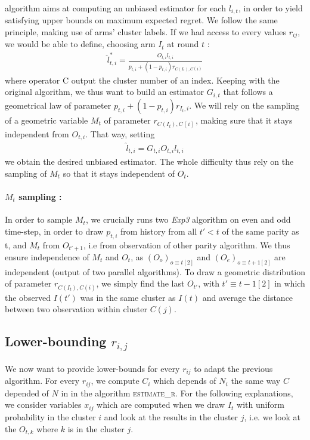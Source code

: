 \documentclass[11pt,a4paper]{article}
\begin{document}
\paragraph{}\cite{valko} algorithm aims at computing an unbiased estimator for each $l_{i,t}$, in order to yield satisfying upper bounds on maximum expected regret. We follow the same principle, making use of arms' cluster labels. If we had access to every values $r_{ij}$, we would be able to define, choosing arm $I_t$ at round $t$ :
\begin{align*}
\hat{l}_{t,i}^{*} = \frac{O_{t,i}l_{t,i}}{p_{t,i}+(1-p_{t,i})r_{C(I_t),C(i)}}
\end{align*}
where operator C output the cluster number of an index.
Keeping with the original algorithm, we thus want to build an estimator $G_{i,t}$ that follows a geometrical law of parameter $p_{t,i}+(1-p_{t,i})r_{I_t,i}$. We will rely on the sampling of a geometric variable $M_t$ of parameter $r_{C(I_t),C(i)}$, making sure that it stays independent from $O_{t,i}$. That way, setting
\begin{align*}
\hat{l}_{t,i}=G_{t,i}O_{t,i}l_{t,i}
\end{align*}
we obtain the desired unbiased estimator. The whole difficulty thus rely on the sampling of $M_t$ so that it stays independent of $O_t$.

\paragraph{$M_t$ sampling :}In order to sample $M_t$, we crucially runs two \textit{Exp3} algorithm on even and odd time-step,
 in order to draw $p_{t,i}$ from history from all $t' < t$ of the same parity as t,
  and $M_t$ from $O_{t'+1}$, i.e from observation of other parity algorithm.
  We thus ensure independence of $M_t$ and $O_t$, as $(O_o)_{o \equiv t [2]}$ and $(O_e)_{o \equiv t+1 [2]}$ are independent (output of two parallel algorithms). To draw a geometric distribution of parameter $r_{C(I_t),C(i)}$, we simply find the last $O_{t'}$, with $t' \equiv t -1 [2]$ in which the observed $I(t')$ was in the same cluster as $I(t)$ and average the distance between two observation within cluster $C(j)$.


\subsection{Lower-bounding $r_{i,j}$}
\paragraph{}We now want to provide lower-bounds for every $r_{ij}$ to adapt the previous algorithm. For every $r_{ij}$, we compute $C_i$ which depends of $N_i$ the same way $C$ depended of $N$ in \cite{valko} in the algorithm \textsc{estimate\_r}. For the following explanations, we consider variables $x_{ij}$ which are computed when we draw $I_t$ with uniform probability in the cluster $i$ and look at the results in the cluster $j$, i.e. we look at the $O_{t,k}$ where $k$ is in the cluster $j$.
\end{document}
